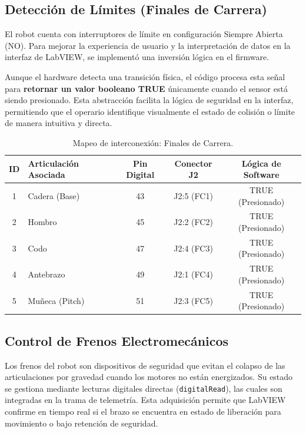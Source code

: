 \subsection{Detección de Límites (Finales de Carrera)}
El robot cuenta con interruptores de límite en configuración Siempre Abierta (NO). Para mejorar la experiencia de usuario y la interpretación de datos en la interfaz de LabVIEW, se implementó una inversión lógica en el firmware. 

Aunque el hardware detecta una transición física, el código procesa esta señal para \textbf{retornar un valor booleano TRUE} únicamente cuando el sensor está siendo presionado. Esta abstracción facilita la lógica de seguridad en la interfaz, permitiendo que el operario identifique visualmente el estado de colisión o límite de manera intuitiva y directa.

\begin{table}[h!]
	\centering
	\renewcommand{\arraystretch}{1.5}
	\caption{Mapeo de interconexión: Finales de Carrera.}
	\label{tab:pines_finales_carrera_v2}
	\begin{tabularx}{\textwidth}{|c|X|c|c|c|}
		\hline
		\rowcolor{green!20}
		\textbf{ID} & \textbf{Articulación Asociada} & \textbf{Pin Digital} & \textbf{Conector J2} & \textbf{Lógica de Software} \\ \hline
		1 & Cadera (Base)  & 43 & J2:5 (FC1) & TRUE (Presionado) \\ \hline
		2 & Hombro         & 45 & J2:2 (FC2) & TRUE (Presionado) \\ \hline
		3 & Codo           & 47 & J2:4 (FC3) & TRUE (Presionado) \\ \hline
		4 & Antebrazo      & 49 & J2:1 (FC4) & TRUE (Presionado) \\ \hline
		5 & Muñeca (Pitch) & 51 & J2:3 (FC5) & TRUE (Presionado) \\ \hline
	\end{tabularx}
\end{table}

\subsection{Control de Frenos Electromecánicos}
Los frenos del robot son dispositivos de seguridad que evitan el colapso de las articulaciones por gravedad cuando los motores no están energizados. Su estado se gestiona mediante lecturas digitales directas (\texttt{digitalRead}), las cuales son integradas en la trama de telemetría. Esta adquisición permite que LabVIEW confirme en tiempo real si el brazo se encuentra en estado de liberación para movimiento o bajo retención de seguridad.

